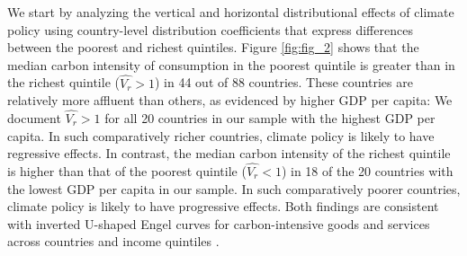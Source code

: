 \documentclass[12pt, a4paper]{article}
\begin{document}
We start by analyzing the vertical and horizontal distributional effects of climate policy using country-level distribution coefficients that express differences between the poorest and richest quintiles. Figure \ref{fig:fig_2} shows that the median carbon intensity of consumption in the poorest quintile is greater than in the richest quintile ($\widehat{V_{r}}>1$) in 44 out of 88 countries. These countries are relatively more affluent than others, as evidenced by higher GDP per capita: We document $\widehat{V_{r}}>1$ for all 20 countries in our sample with the highest GDP per capita. In such comparatively richer countries, climate policy is likely to have regressive effects. In contrast, the median carbon intensity of the richest quintile is higher than that of the poorest quintile ($\widehat{V_{r}}<1$) in 18 of the 20 countries with the lowest GDP per capita in our sample. In such comparatively poorer countries, climate policy is likely to have progressive effects. Both findings are consistent with inverted U-shaped Engel curves for carbon-intensive goods and services across countries and income quintiles \autocite{Dorband.2019}. 
\end{document}
